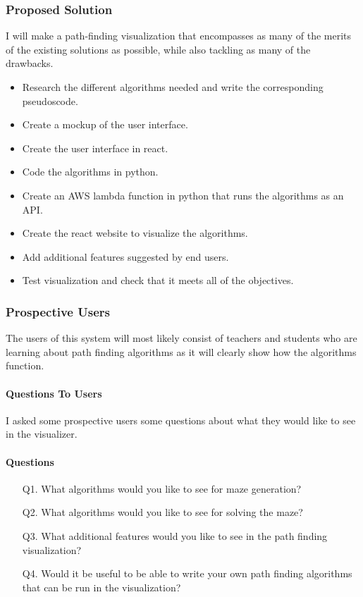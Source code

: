 \documentclass[titlepage]{article}
\begin{document}
\subsubsection{Proposed Solution}
I will make a path-finding visualization that encompasses as many of the merits of the existing solutions as possible, while also tackling as many of the drawbacks.
\begin{itemize}
    \item Research the different algorithms needed and write the corresponding pseudoscode.
    \item Create a mockup of the user interface.
    \item Create the user interface in react.
    \item Code the algorithms in python.
    \item Create an AWS lambda function in python that runs the algorithms as an API.
    \item Create the react website to visualize the algorithms.
    \item Add additional features suggested by end users.
    \item Test visualization and check that it meets all of the objectives.
\end{itemize}
\subsubsection{Prospective Users}
The users of this system will most likely consist of teachers and students who are learning about path finding algorithms as it will clearly show how the algorithms function.
\paragraph{Questions To Users}
I asked some prospective users some questions about what they would like to see in the visualizer.
\paragraph*{Questions}
\begin{enumerate}
    \item[Q1.]What algorithms would you like to see for maze generation?
    \item[Q2.]What algorithms would you like to see for solving the maze?
    \item[Q3.]What additional features would you like to see in the path finding visualization?
    \item[Q4.]Would it be useful to be able to write your own path finding algorithms that can be run in the visualization?  
\end{enumerate}
\end{document}
